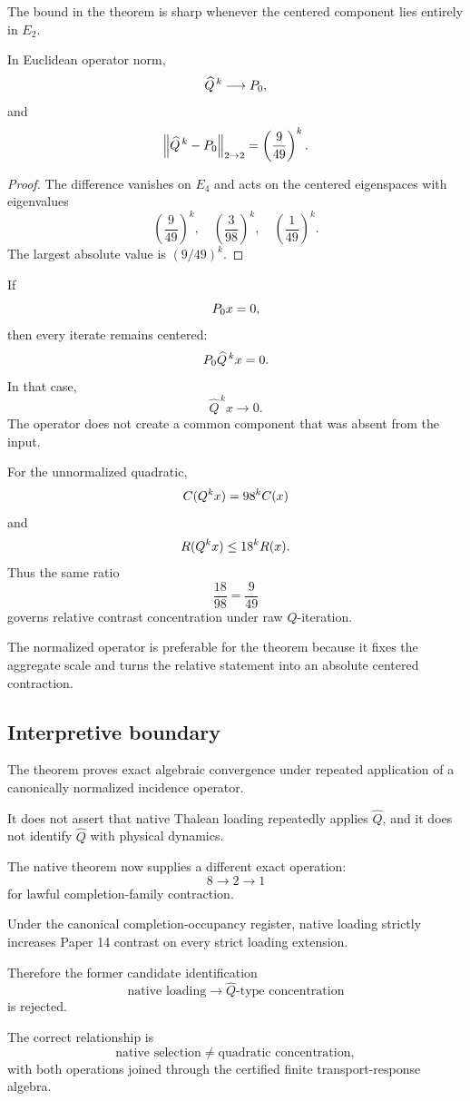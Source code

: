 The bound in the theorem is sharp whenever the centered component
lies entirely in \(E_2\).

\begin{corollary}
In Euclidean operator norm,
\[
\widehat{Q}^{\,k}
\longrightarrow
P_{0},
\]
and
\[
\left\|
\widehat{Q}^{\,k}-P_{0}
\right\|_{2\to2}
=
\left(\frac{9}{49}\right)^k.
\]
\end{corollary}

\begin{proof}
The difference vanishes on \(E_4\) and acts on the centered
eigenspaces with eigenvalues
\[
\left(\frac{9}{49}\right)^k,\quad
\left(\frac{3}{98}\right)^k,\quad
\left(\frac{1}{49}\right)^k.
\]
The largest absolute value is
\((9/49)^k\).
\end{proof}

\begin{remark}
If
\[
P_{0} x=0,
\]
then every iterate remains centered:
\[
P_{0}\widehat{Q}^{\,k}x=0.
\]
In that case,
\[
\widehat{Q}^{\,k}x\longrightarrow0.
\]
The operator does not create a common component that was absent from
the input.
\end{remark}

\begin{remark}
For the unnormalized quadratic,
\[
C(Q^kx)
=
98^kC(x)
\]
and
\[
R(Q^kx)
\le
18^kR(x).
\]
Thus the same ratio
\[
\frac{18}{98}
=
\frac{9}{49}
\]
governs relative contrast concentration under raw \(Q\)-iteration.

The normalized operator is preferable for the theorem because it
fixes the aggregate scale and turns the relative statement into an
absolute centered contraction.
\end{remark}

\subsection{Interpretive boundary}


The theorem proves exact algebraic convergence under repeated
application of a canonically normalized incidence operator.

It does not assert that native Thalean loading repeatedly applies
\(\widehat Q\), and it does not identify \(\widehat Q\) with physical
dynamics.

The native theorem now supplies a different exact operation:
\[
8\longrightarrow2\longrightarrow1
\]
for lawful completion-family contraction.

Under the canonical completion-occupancy register, native loading
strictly increases Paper 14 contrast on every strict loading
extension.

Therefore the former candidate identification
\[
\text{native loading}
\longrightarrow
\widehat Q\text{-type concentration}
\]
is rejected.

The correct relationship is
\[
\text{native selection}
\neq
\text{quadratic concentration},
\]
with both operations joined through the certified finite
transport-response algebra.
